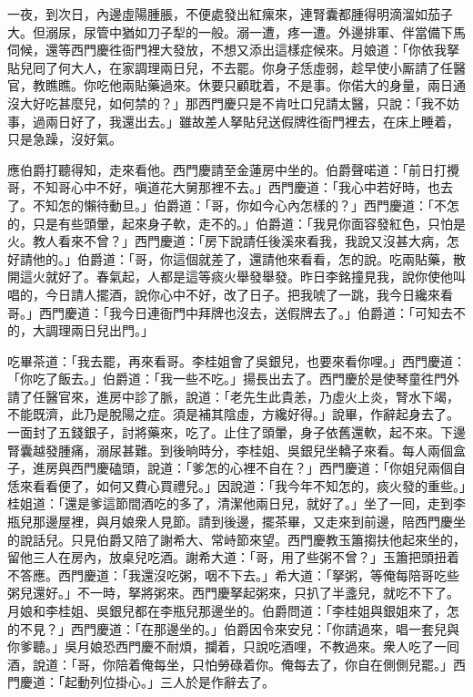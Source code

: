 一夜，到次日，內邊虛陽腫脹，不便處發出紅瘰來，連腎囊都腫得明滴溜如茄子大。但溺尿，尿管中猶如刀子犁的一般。溺一遭，疼一遭。外邊排軍、伴當備下馬伺候，還等西門慶徃衙門裡大發放，不想又添出這樣症候來。月娘道：「你依我拏貼兒囘了何大人，在家調理兩日兒，不去罷。你身子恁虛弱，趁早使小厮請了任醫官，教瞧瞧。你吃他兩貼藥過來。休要只顧耽着，不是事。你偌大的身量，兩日通沒大好吃甚麼兒，如何禁的？」那西門慶只是不肯吐口兒請太醫，只說：「我不妨事，過兩日好了，我還出去。」雖故差人拏貼兒送假牌徃衙門裡去，在床上睡着，只是急躁，沒好氣。

應伯爵打聽得知，走來看他。西門慶請至金蓮房中坐的。伯爵聲喏道：「前日打攪哥，不知哥心中不好，嗔道花大舅那裡不去。」西門慶道：「我心中若好時，也去了。不知怎的懶待動旦。」伯爵道：「哥，你如今心內怎樣的？」西門慶道：「不怎的，只是有些頭暈，起來身子軟，走不的。」伯爵道：「我見你面容發紅色，只怕是火。教人看來不曾？」西門慶道：「房下說請任後溪來看我，我說又沒甚大病，怎好請他的。」伯爵道：「哥，你這個就差了，還請他來看看，怎的說。吃兩貼藥，散開這火就好了。春氣起，人都是這等痰火舉發舉發。昨日李銘撞見我，說你使他叫唱的，今日請人擺酒，說你心中不好，改了日子。把我唬了一跳，我今日纔來看哥。」西門慶道：「我今日連衙門中拜牌也沒去，送假牌去了。」伯爵道：「可知去不的，大調理兩日兒出門。」

吃畢茶道：「我去罷，再來看哥。李桂姐會了吳銀兒，也要來看你哩。」西門慶道：「你吃了飯去。」伯爵道：「我一些不吃。」揚長出去了。西門慶於是使琴童徃門外請了任醫官來，進房中診了脈，說道：「老先生此貴恙，乃虛火上炎，腎水下竭，不能既濟，此乃是脫陽之症。須是補其陰虛，方纔好得。」{}說畢，作辭起身去了。一面封了五錢銀子，討將藥來，吃了。止住了頭暈，{}身子依舊還軟，起不來。下邊腎囊越發腫痛，溺尿甚難。到後晌時分，李桂姐、吳銀兒坐轎子來看。每人兩個盒子，進房與西門慶磕頭，說道：「爹怎的心裡不自在？」西門慶道：「你姐兒兩個自恁來看看便了，如何又費心買禮兒。」因說道：「我今年不知怎的，痰火發的重些。」桂姐道：「還是爹這節間酒吃的多了，清潔他兩日兒，就好了。」坐了一囘，走到李瓶兒那邊屋裡，與月娘衆人見節。請到後邊，擺茶畢，又走來到前邊，陪西門慶坐的說話兒。只見伯爵又陪了謝希大、常峙節來望。西門慶教玉簫搊扶他起來坐的，留他三人在房內，放桌兒吃酒。謝希大道：「哥，用了些粥不曾？」玉簫把頭扭着不答應。西門慶道：「我還沒吃粥，咽不下去。」希大道：「拏粥，等俺每陪哥吃些粥兒還好。」不一時，拏將粥來。西門慶拏起粥來，只扒了半盞兒，就吃不下了。月娘和李桂姐、吳銀兒都在李瓶兒那邊坐的。伯爵問道：「李桂姐與銀姐來了，怎的不見？」西門慶道：「在那邊坐的。」伯爵因令來安兒：「你請過來，唱一套兒與你爹聽。」吳月娘恐西門慶不耐煩，攔着，只說吃酒哩，不教過來。衆人吃了一囘酒，說道：「哥，你陪着俺每坐，只怕勞碌着你。俺每去了，你自在側側兒罷。」西門慶道：「起動列位掛心。」三人於是作辭去了。

